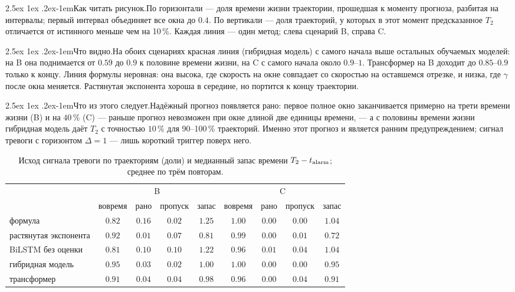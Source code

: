 \documentclass[12pt,a4paper]{report}
\makeatletter
\renewcommand\paragraph{\@startsection{paragraph}{4}{\z@}%
  {2.5ex \@plus1ex \@minus.2ex}{-1em}{\normalfont\normalsize\bfseries}}
\numberwithin{equation}{chapter}
\newcommand{\figread}{\paragraph{Как читать рисунок.}}
\newcommand{\figsee}{\paragraph{Что видно.}}
\newcommand{\figgen}{\paragraph{Что из этого следует.}}
\makeatother
\begin{document}
\figread По горизонтали --- доля времени жизни траектории, прошедшая к
моменту прогноза, разбитая на интервалы; первый интервал объединяет все
окна до $0.4$. По вертикали --- доля траекторий, у которых в этот момент
предсказанное $T_2$ отличается от истинного меньше чем на 10\,\%. Каждая
линия --- один метод; слева сценарий B, справа C.

\figsee На обоих сценариях красная линия (гибридная модель) с самого
начала выше остальных обучаемых моделей: на B она поднимается от $0.59$ до
$0.9$ к половине времени жизни, на C с самого начала около $0.9$--$1$.
Трансформер на B доходит до $0.85$--$0.9$ только к концу. Линия формулы
неровная: она высока, где скорость на окне совпадает со скоростью на
оставшемся отрезке, и низка, где $\gamma$ после окна меняется. Растянутая
экспонента хороша в середине, но портится к концу траектории.

\figgen Надёжный прогноз появляется рано: первое полное окно заканчивается
примерно на трети времени жизни (B) и на $40\,\%$ (C) --- раньше прогноз
невозможен при окне длиной две единицы времени, --- а с половины времени
жизни гибридная модель даёт $T_2$ с точностью $10\,\%$ для 90--100\,\%
траекторий. Именно этот прогноз и является ранним предупреждением; сигнал
тревоги с горизонтом $\Delta=1$ --- лишь короткий триггер поверх него.

\begin{table}[h]
\centering
\caption{Исход сигнала тревоги по траекториям (доли) и медианный запас
времени $T_2-t_{\rm alarm}$; среднее по трём повторам.}
\label{tab:r18}
\small
\begin{tabular}{@{}lcccc|cccc@{}}
\toprule
 & \multicolumn{4}{c|}{B} & \multicolumn{4}{c}{C} \\
 & вовремя & рано & пропуск & запас & вовремя & рано & пропуск & запас \\
\midrule
формула & $0.82$ & $0.16$ & $0.02$ & $1.25$ & $1.00$ & $0.00$ & $0.00$ & $1.04$ \\
растянутая экспонента & $0.92$ & $0.01$ & $0.07$ & $0.81$ & $0.99$ & $0.00$ & $0.01$ & $0.72$ \\
BiLSTM без оценки & $0.81$ & $0.10$ & $0.10$ & $1.22$ & $0.96$ & $0.01$ & $0.04$ & $1.04$ \\
гибридная модель & $\mathbf{0.95}$ & $0.03$ & $0.02$ & $1.00$ & $\mathbf{1.00}$ & $0.00$ & $0.00$ & $0.95$ \\
трансформер & $0.91$ & $0.04$ & $0.04$ & $0.98$ & $0.96$ & $0.00$ & $0.04$ & $0.91$ \\
\bottomrule
\end{tabular}
\end{table}
\end{document}
